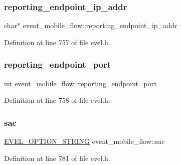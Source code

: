 \subsubsection{\texorpdfstring{reporting\+\_\+endpoint\+\_\+ip\+\_\+addr}{reporting\_endpoint\_ip\_addr}}
{\footnotesize\ttfamily char$\ast$ event\+\_\+mobile\+\_\+flow\+::reporting\+\_\+endpoint\+\_\+ip\+\_\+addr}



Definition at line 757 of file evel.\+h.

\hypertarget{structevent__mobile__flow_a58808b53f7850104c2d978f6884dfe01}{}\label{structevent__mobile__flow_a58808b53f7850104c2d978f6884dfe01} 
\subsubsection{\texorpdfstring{reporting\+\_\+endpoint\+\_\+port}{reporting\_endpoint\_port}}
{\footnotesize\ttfamily int event\+\_\+mobile\+\_\+flow\+::reporting\+\_\+endpoint\+\_\+port}



Definition at line 758 of file evel.\+h.

\hypertarget{structevent__mobile__flow_ade1ab48ebf79ec3fa205293cb9f19b34}{}\label{structevent__mobile__flow_ade1ab48ebf79ec3fa205293cb9f19b34} 
\subsubsection{\texorpdfstring{sac}{sac}}
{\footnotesize\ttfamily \hyperlink{evel_8h_a0de5113a7b72de93c0c7b644f7ea7ec3}{E\+V\+E\+L\+\_\+\+O\+P\+T\+I\+O\+N\+\_\+\+S\+T\+R\+I\+NG} event\+\_\+mobile\+\_\+flow\+::sac}



Definition at line 781 of file evel.\+h.

\hypertarget{structevent__mobile__flow_af2e05437a8986a9a3fe155481c866844}{}\label{structevent__mobile__flow_af2e05437a8986a9a3fe155481c866844} 
